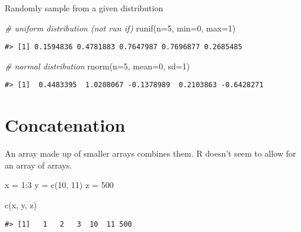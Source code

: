 \documentclass[
]{book}
\newenvironment{Shaded}{\begin{snugshade}}{\end{snugshade}}
\newcommand{\AttributeTok}[1]{\textcolor[rgb]{0.77,0.63,0.00}{#1}}
\newcommand{\CommentTok}[1]{\textcolor[rgb]{0.56,0.35,0.01}{\textit{#1}}}
\newcommand{\DecValTok}[1]{\textcolor[rgb]{0.00,0.00,0.81}{#1}}
\newcommand{\FunctionTok}[1]{\textcolor[rgb]{0.00,0.00,0.00}{#1}}
\newcommand{\NormalTok}[1]{#1}
\newcommand{\OtherTok}[1]{\textcolor[rgb]{0.56,0.35,0.01}{#1}}
\newcommand{\SpecialCharTok}[1]{\textcolor[rgb]{0.00,0.00,0.00}{#1}}
\begin{document}
Randomly sample from a given distribution

\begin{Shaded}
\begin{Highlighting}[]
\CommentTok{\# uniform distribution (not \textquotesingle{}run if\textquotesingle{})}
\FunctionTok{runif}\NormalTok{(}\AttributeTok{n=}\DecValTok{5}\NormalTok{, }\AttributeTok{min=}\DecValTok{0}\NormalTok{, }\AttributeTok{max=}\DecValTok{1}\NormalTok{)}
\end{Highlighting}
\end{Shaded}

\begin{verbatim}
#> [1] 0.1594836 0.4781883 0.7647987 0.7696877 0.2685485
\end{verbatim}

\begin{Shaded}
\begin{Highlighting}[]
\CommentTok{\# normal distribution}
\FunctionTok{rnorm}\NormalTok{(}\AttributeTok{n=}\DecValTok{5}\NormalTok{, }\AttributeTok{mean=}\DecValTok{0}\NormalTok{, }\AttributeTok{sd=}\DecValTok{1}\NormalTok{)}
\end{Highlighting}
\end{Shaded}

\begin{verbatim}
#> [1]  0.4483395  1.0208067 -0.1378989  0.2103863 -0.6428271
\end{verbatim}

\hypertarget{concatenation}{%
\section{Concatenation}\label{concatenation}}

An array made up of smaller arrays combines them. R doesn't seem to allow for an array of arrays.

\begin{Shaded}
\begin{Highlighting}[]
\NormalTok{x }\OtherTok{=} \DecValTok{1}\SpecialCharTok{:}\DecValTok{3}
\NormalTok{y }\OtherTok{=} \FunctionTok{c}\NormalTok{(}\DecValTok{10}\NormalTok{, }\DecValTok{11}\NormalTok{)}
\NormalTok{z }\OtherTok{=} \DecValTok{500}

\FunctionTok{c}\NormalTok{(x, y, z)}
\end{Highlighting}
\end{Shaded}

\begin{verbatim}
#> [1]   1   2   3  10  11 500
\end{verbatim}
\end{document}

